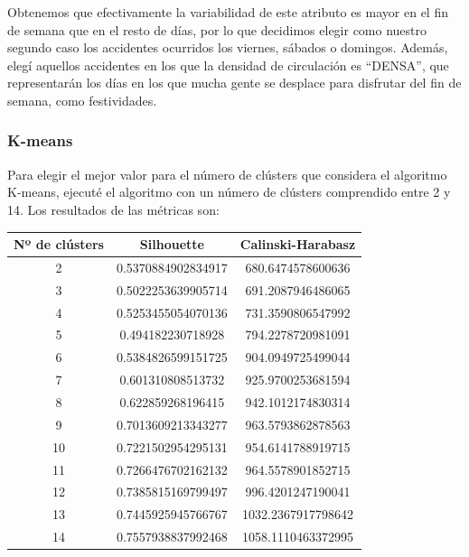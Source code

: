 \documentclass[a4]{article}
\begin{document}
Obtenemos que efectivamente la variabilidad de este atributo es mayor en el fin de semana que en el resto de días, por lo que decidimos elegir como nuestro segundo caso los accidentes ocurridos los viernes, sábados o domingos.  Además, elegí aquellos accidentes en los que la densidad de circulación es ``DENSA'', que representarán los días en los que mucha gente se desplace para disfrutar del fin de semana, como festividades.

\subsubsection{K-means}

Para elegir el mejor valor para el número de clústers que considera el algoritmo K-means, ejecuté el algoritmo con un número de clústers comprendido entre 2 y 14. Los resultados de las métricas son:

\begin{center}
\begin{tabular}{|c|c|c|}
\hline
\multicolumn{1}{|c|}{\textbf{Nº de clústers}}& \textbf{Silhouette} & \textbf{Calinski-Harabasz}\\ \hline
  2  & 0.5370884902834917 & 680.6474578600636  \\ \hline
  3  & 0.5022253639905714 & 691.2087946486065  \\ \hline
  4  & 0.5253455054070136 & 731.3590806547992  \\ \hline
  5  & 0.494182230718928  & 794.2278720981091  \\ \hline
  6  & 0.5384826599151725 & 904.0949725499044  \\ \hline
  7  & 0.601310808513732  & 925.9700253681594  \\ \hline
  8  & 0.622859268196415  & 942.1012174830314  \\ \hline
  9  & 0.7013609213343277 & 963.5793862878563  \\ \hline
 10  & 0.7221502954295131 & 954.6141788919715  \\ \hline
 11  & 0.7266476702162132 & 964.5578901852715  \\ \hline
 12  & 0.7385815169799497 & 996.4201247190041  \\ \hline
 13  & 0.7445925945766767 & 1032.2367917798642 \\ \hline
 14  & 0.7557938837992468 & 1058.1110463372995 \\ \hline
\end{tabular}
\end{center}
\end{document}
